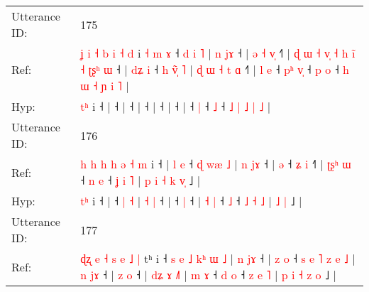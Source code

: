 \documentclass[10pt]{article}
\DeclareRobustCommand{\hl}[1]{{\textcolor{red}{#1}}}
\begin{document}
\begin{longtable}{ll}
 \\
\midrule
Utterance ID: & 175 \\
Ref: & \hl{ʝ}\hl{ }\hl{i}\hl{ }\hl{˧}\hl{ }\hl{b}\hl{ }\hl{i}\hl{ }\hl{˧}\hl{ }\hl{d} i\hl{ }\hl{˧}\hl{ }\hl{m}\hl{ }\hl{ɤ} ˧\hl{ }\hl{d}\hl{ }\hl{i}\hl{ }\hl{˥} |\hl{ }\hl{n}\hl{ }\hl{j}\hl{ɤ} ˧ |\hl{ }\hl{ə}\hl{ }\hl{˧}\hl{ }\hl{v}\hl{̩} ˧\hl{˥} |\hl{ }\hl{ɖ}\hl{ }\hl{ɯ}\hl{ }\hl{˧}\hl{ }\hl{v}\hl{̩}\hl{ }\hl{˧}\hl{ }\hl{h}\hl{ }\hl{i}\hl{̃}\hl{ }\hl{˧}\hl{ }\hl{ʈ}\hl{ʂ}\hl{ʰ}\hl{ }\hl{ɯ} ˧ |\hl{ }\hl{d}\hl{ʑ}\hl{ }\hl{i} ˧\hl{ }\hl{h}\hl{ }\hl{v}\hl{̃}\hl{̩}\hl{ }\hl{˥} |\hl{ }\hl{ɖ}\hl{ }\hl{ɯ}\hl{ }\hl{˧}\hl{ }\hl{t}\hl{ }\hl{ɑ} ˧\hl{˥} |\hl{ }\hl{l}\hl{ }\hl{e} ˧\hl{ }\hl{p}\hl{ʰ} \hl{v}\hl{̩} ˧\hl{ }\hl{p} \hl{o} ˧\hl{ }\hl{h} \hl{ɯ} \hl{˧} \hl{ɲ} \hl{i} \hl{˥} |
 \\
Hyp: & \hl{}\hl{}\hl{}\hl{}\hl{}\hl{}\hl{}\hl{}\hl{}\hl{}\hl{}\hl{t}\hl{ʰ} i\hl{}\hl{}\hl{}\hl{}\hl{}\hl{} ˧\hl{}\hl{}\hl{}\hl{}\hl{}\hl{} |\hl{}\hl{}\hl{}\hl{}\hl{} ˧ |\hl{}\hl{}\hl{}\hl{}\hl{}\hl{}\hl{} ˧\hl{} |\hl{}\hl{}\hl{}\hl{}\hl{}\hl{}\hl{}\hl{}\hl{}\hl{}\hl{}\hl{}\hl{}\hl{}\hl{}\hl{}\hl{}\hl{}\hl{}\hl{}\hl{}\hl{}\hl{}\hl{} ˧ |\hl{}\hl{}\hl{}\hl{}\hl{} ˧\hl{}\hl{}\hl{}\hl{}\hl{}\hl{}\hl{}\hl{} |\hl{}\hl{}\hl{}\hl{}\hl{}\hl{}\hl{}\hl{}\hl{}\hl{} ˧\hl{} |\hl{}\hl{}\hl{}\hl{} ˧\hl{}\hl{}\hl{} \hl{}\hl{|} ˧\hl{}\hl{} \hl{˩} ˧\hl{}\hl{} \hl{˩} \hl{|} \hl{˩} \hl{|} \hl{˩} |
 \\
\midrule
Utterance ID: & 176 \\
Ref: & \hl{h}\hl{ }\hl{h}\hl{ }\hl{h}\hl{ }\hl{h}\hl{ }\hl{ə}\hl{ }\hl{˧}\hl{ }\hl{m} i ˧ |\hl{ }\hl{l}\hl{ }\hl{e} ˧\hl{ }\hl{ɖ} \hl{w}\hl{æ} \hl{˩} | \hl{n} \hl{j}\hl{ɤ} ˧ |\hl{ }\hl{ə} ˧\hl{ }\hl{ʑ} \hl{i} ˧\hl{˥} | \hl{ʈ}\hl{ʂ}\hl{ʰ} \hl{ɯ} ˧\hl{ }\hl{n} \hl{e} ˧ \hl{ʝ} \hl{i} \hl{˥} |\hl{ }\hl{p}\hl{ }\hl{i}\hl{ }\hl{˧} \hl{k} \hl{v}\hl{̩} ˩ |
 \\
Hyp: & \hl{}\hl{}\hl{}\hl{}\hl{}\hl{}\hl{}\hl{}\hl{}\hl{}\hl{}\hl{t}\hl{ʰ} i ˧ |\hl{}\hl{}\hl{}\hl{} ˧\hl{}\hl{} \hl{}\hl{|} \hl{˧} | \hl{˧} \hl{}\hl{|} ˧ |\hl{}\hl{} ˧\hl{}\hl{} \hl{|} ˧\hl{} | \hl{}\hl{}\hl{˧} \hl{|} ˧\hl{}\hl{} \hl{˩} ˧ \hl{˩} \hl{˧} \hl{˩} |\hl{}\hl{}\hl{}\hl{}\hl{}\hl{} \hl{˩} \hl{}\hl{|} ˩ |
 \\
\midrule
Utterance ID: & 177 \\
Ref: & \hl{ɖ}\hl{ʐ}\hl{ }\hl{e}\hl{ }\hl{˧}\hl{ }\hl{s}\hl{ }\hl{e}\hl{ }\hl{˩}\hl{ }\hl{|}\hl{ }tʰ i ˧\hl{ }\hl{s}\hl{ }\hl{e}\hl{ }\hl{˩}\hl{ }\hl{k}\hl{ʰ}\hl{ }\hl{ɯ}\hl{ }\hl{˩} |\hl{ }\hl{n}\hl{ }\hl{j}\hl{ɤ} ˧ |\hl{ }\hl{z}\hl{ }\hl{o} ˧\hl{ }\hl{s}\hl{ }\hl{e}\hl{ }\hl{˥}\hl{ }\hl{z}\hl{ }\hl{e}\hl{ }\hl{˩} |\hl{ }\hl{n}\hl{ }\hl{j}\hl{ɤ} ˧ |\hl{ }\hl{z}\hl{ }\hl{o} ˧ |\hl{ }\hl{d}\hl{ʑ}\hl{ }\hl{ɤ} \hl{˩}\hl{˥} |\hl{ }\hl{m}\hl{ }\hl{ɤ} ˧\hl{ }\hl{d} \hl{o} ˧ \hl{z} \hl{e} \hl{˥} |\hl{ }\hl{p}\hl{ }\hl{i}\hl{ }\hl{˧} \hl{z} \hl{o} ˩ |

\end{longtable}
\end{document}

